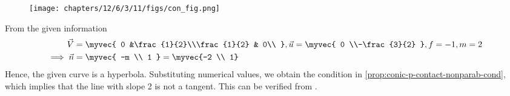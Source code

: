 	\begin{figure}[H]
		\centering
 \texttt{[image: chapters/12/6/3/11/figs/con\_fig.png]}
		\caption{}
		\label{fig:12/6/3/11}
  	\end{figure}
From the given information
\begin{align}
	\vec{V}
	&=\myvec{
		0 &\frac{1}{2}\\\frac{1}{2} & 0\\
	},
\vec{u} = \myvec{
0 \\-\frac{3}{2}
},  f = -1, m=2
	\label{12/6/3/11/eq1}
	\\
	\implies
	\vec{n}&=\myvec{
-m \\ 1 
} = \myvec{-2 \\ 1}  \\
\label{12/6/3/11/eq2}
\end{align}
Hence, the given curve is a hyperbola.
Substituting  numerical values, we obtain the condition in 
	\eqref{prop:conic-p-contact-nonparab-cond},
which implies that the line with slope 2 is not a tangent.  This can be verified from  
		.
